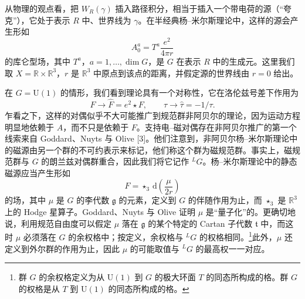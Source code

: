 \documentclass[11pt,a4paper,UTF8]{ctexart}
\begin{document}
从物理的观点看，把 $W_{R}(\gamma)$ 插入路径积分，相当于插入一个带电荷的源（“夸克”），它处于表示 $R$ 中、世界线为 $\gamma$。在半经典杨–米尔斯理论中，这样的源会产生形如
\[
    A^{a}_{0}=T^{a}\frac{e^{2}}{4\pi r}
\]
的库仑型场，其中 $T^{a}$，$a=1,\ldots,\dim G$，是 $G$ 在表示 $R$ 中的生成元。这里我们取 $X=\mathbb{R}\times\mathbb{R}^{3}$，$r$ 是 $\mathbb{R}^{3}$ 中原点到该点的距离，并假定源的世界线由 $r=0$ 给出。

在 $G=\mathrm{U}(1)$ 的情形，我们看到理论具有一个对称性，它在洛伦兹号差下作用为
\[
    F\to\hat{F}=e^{2}\star F,\qquad \tau\to\hat{\tau}=-1/\tau.
\]
乍看之下，这样的对偶似乎不大可能推广到规范群非阿贝尔的理论，因为运动方程明显地依赖于 $A$，而不只是依赖于 $F$。支持电–磁对偶存在非阿贝尔推广的第一个线索来自 Goddard、Nuyts 与 Olive [3]。他们注意到，非阿贝尔杨–米尔斯理论中的磁源由另一个群的不可约表示来标记，他们称这个群为磁规范群。事实上，磁规范群与 $G$ 的朗兰兹对偶群重合，因此我们将它记作 ${}^{L}G$。杨–米尔斯理论中的静态磁源应当产生形如
\[
    F=\star_{3}\,\mathrm{d}\left(\frac{\mu}{2r}\right)
\]
的场，其中 $\mu$ 是 $G$ 的李代数 $\mathfrak{g}$ 的元素，定义到 $G$ 的伴随作用为止，而 $\star_{3}$ 是 $\mathbb{R}^{3}$ 上的 Hodge 星算子。Goddard、Nuyts 与 Olive 证明 $\mu$ 是“量子化”的。更确切地说，利用规范自由度可以假定 $\mu$ 落在 $\mathfrak{g}$ 的某个特定的 Cartan 子代数 $\mathfrak{t}$ 中，而这时 $\mu$ 必须落在 $G$ 的余权格中；按定义，余权格与 ${}^{L}G$ 的权格相同。\footnote{群 $G$ 的余权格定义为从 $\mathrm{U}(1)$ 到 $G$ 的极大环面 $T$ 的同态所构成的格。群 $G$ 的权格是从 $T$ 到 $\mathrm{U}(1)$ 的同态所构成的格。}此外，$\mu$ 还定义到外尔群的作用为止，因此 $\mu$ 的可能取值与 ${}^{L}G$ 的最高权一一对应。
\end{document}
